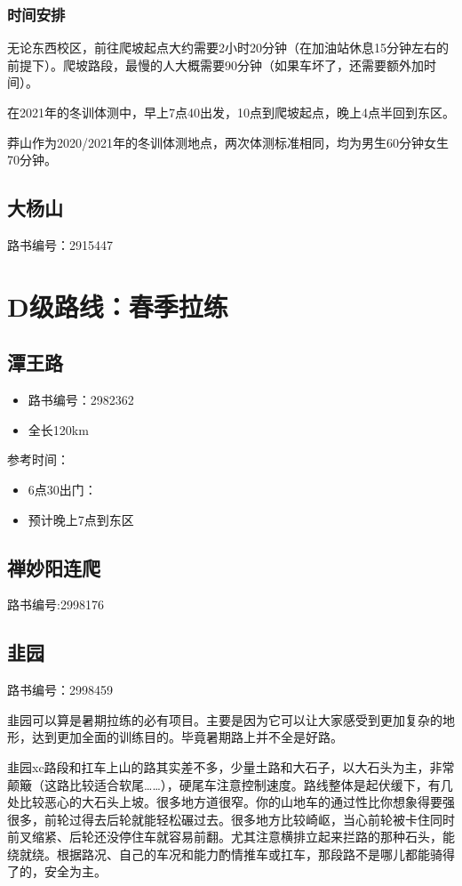 \documentclass{ctexbook}
\begin{document}
\subsubsection{时间安排}

无论东西校区，前往爬坡起点大约需要2小时20分钟（在加油站休息15分钟左右的前提下）。爬坡路段，最慢的人大概需要90分钟（如果车坏了，还需要额外加时间）。

在2021年的冬训体测中，早上7点40出发，10点到爬坡起点，晚上4点半回到东区。

莽山作为2020/2021年的冬训体测地点，两次体测标准相同，均为男生60分钟女生70分钟。

\newpage
\subsection{大杨山}
路书编号：2915447
\section{D级路线：春季拉练}
\subsection{潭王路}
\begin{itemize}
    \item 路书编号：2982362
    \item 全长120km
\end{itemize}
参考时间：
\begin{itemize}
    \item 6点30出门：
    \item 预计晚上7点到东区
\end{itemize}
\subsection{禅妙阳连爬}
路书编号:2998176
\subsection{韭园}
路书编号：2998459

韭园可以算是暑期拉练的必有项目。主要是因为它可以让大家感受到更加复杂的地形，达到更加全面的训练目的。毕竟暑期路上并不全是好路。

韭园xc路段和扛车上山的路其实差不多，少量土路和大石子，以大石头为主，非常颠簸（这路比较适合软尾……），硬尾车注意控制速度。路线整体是起伏缓下，有几处比较恶心的大石头上坡。很多地方道很窄。你的山地车的通过性比你想象得要强很多，前轮过得去后轮就能轻松碾过去。很多地方比较崎岖，当心前轮被卡住同时前叉缩紧、后轮还没停住车就容易前翻。尤其注意横排立起来拦路的那种石头，能绕就绕。根据路况、自己的车况和能力酌情推车或扛车，那段路不是哪儿都能骑得了的，安全为主。
\end{document}

